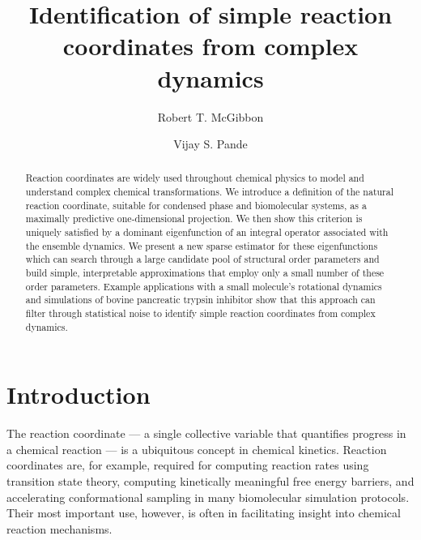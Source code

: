 \documentclass[aip, jcp, reprint, nolinenumbers, twocolumn, nobalancelastpage, nofootinbib]{revtex4-1}
\begin{document}
\title{Identification of simple reaction coordinates from complex dynamics}
\author{Robert T. McGibbon}
\author{Vijay S. Pande}

\begin{abstract}
Reaction coordinates are widely used throughout chemical physics to model and understand complex chemical transformations. We introduce a definition of the natural reaction coordinate, suitable for condensed phase and biomolecular systems, as a maximally predictive one-dimensional projection. We then show this criterion is uniquely satisfied by a dominant eigenfunction of an integral operator associated with the ensemble dynamics. We present a new sparse estimator for these eigenfunctions which can search through a large candidate pool of structural order parameters and build simple, interpretable approximations that employ only a small number of these order parameters. Example applications with a small molecule's rotational dynamics and simulations of bovine pancreatic trypsin inhibitor show that this approach can filter through statistical noise to identify simple reaction coordinates from complex dynamics.
\end{abstract}
\maketitle


\section{Introduction}

The reaction coordinate --- a single collective variable that quantifies progress in a chemical reaction ---  is a ubiquitous concept in chemical kinetics.\cite{eyring1935activated, KRAMERS1940284} Reaction coordinates are, for example, required for computing reaction rates using transition state theory,\cite{eyring1935activated, KRAMERS1940284, truhlar1996current} computing kinetically meaningful free energy barriers,\cite{sichun2006effective} and accelerating conformational sampling in many biomolecular simulation protocols.\cite{Bernardi2015Enhanced, laio2002escaping, kastner2011umbrella, knight2009lambda, Torrie1977187} Their most important use, however, is often in facilitating insight into chemical reaction mechanisms.\cite{steinfeld1999chemical, RevModPhys.62.251, peters2015common}
\end{document}
